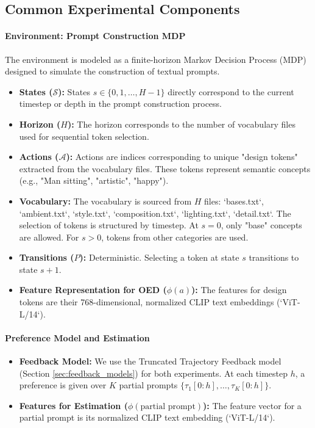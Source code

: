\documentclass{article}
\newcommand{\mS}{\mathcal{S}}
\newcommand{\mA}{\mathcal{A}}
\begin{document}
\subsection{Common Experimental Components}
\label{sec:appendix_exp_details_common}

\paragraph{Environment: Prompt Construction MDP}
\label{sec:appendix_exp_details_env}
The environment is modeled as a finite-horizon Markov Decision Process (MDP) designed to simulate the construction of textual prompts.
\begin{itemize}
    \item \textbf{States ($\mS$):} States $s \in \{0, 1, \dots, H-1\}$ directly correspond to the current timestep or depth in the prompt construction process.
    \item \textbf{Horizon ($H$):} The horizon corresponds to the number of vocabulary files used for sequential token selection.
    \item \textbf{Actions ($\mA$):} Actions are indices corresponding to unique "design tokens" extracted from the vocabulary files. These tokens represent semantic concepts (e.g., "Man sitting", "artistic", "happy").
    \item \textbf{Vocabulary:} The vocabulary is sourced from $H$ files: `bases.txt`, `ambient.txt`, `style.txt`, `composition.txt`, `lighting.txt`, `detail.txt`. The selection of tokens is structured by timestep. At $s=0$, only "base" concepts are allowed. For $s>0$, tokens from other categories are used.
    \item \textbf{Transitions ($P$):} Deterministic. Selecting a token at state $s$ transitions to state $s+1$.
    \item \textbf{Feature Representation for OED ($\phi(a)$):} The features for design tokens are their 768-dimensional, normalized CLIP text embeddings (`ViT-L/14`).
\end{itemize}

\paragraph{Preference Model and Estimation}
\label{sec:appendix_exp_details_pref_model}
\begin{itemize}
    \item \textbf{Feedback Model:} We use the Truncated Trajectory Feedback model (Section \ref{sec:feedback_models}) for both experiments. At each timestep $h$, a preference is given over $K$ partial prompts $\{\tau_{1}[0:h], \dots, \tau_{K}[0:h]\}$.
    \item \textbf{Features for Estimation ($\phi(\text{partial prompt})$):} The feature vector for a partial prompt is its normalized CLIP text embedding (`ViT-L/14`).
\end{itemize}
\end{document}
